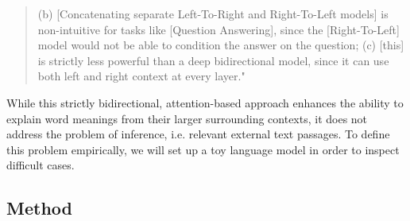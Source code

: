 \documentclass[jou]{apa6} %
\begin{document}
\blockquote[{\cite[p.~8]{devlinBertPretrainingDeep2018}}]{(b) [Concatenating separate Left-To-Right and Right-To-Left models] is non-intuitive for tasks like [Question Answering], since the [Right-To-Left] model would not be able to condition the answer on the question; (c) [this] is strictly less powerful than a deep bidirectional model, since it can use both left and right context at every layer."}
While this strictly bidirectional, attention-based approach enhances the ability to explain word meanings from their larger surrounding contexts, it does not address the problem of inference, i.e. relevant external text passages. To define this problem empirically, we will set up a toy language model in order to inspect difficult cases. 

\subsection{Method}
\end{document}
